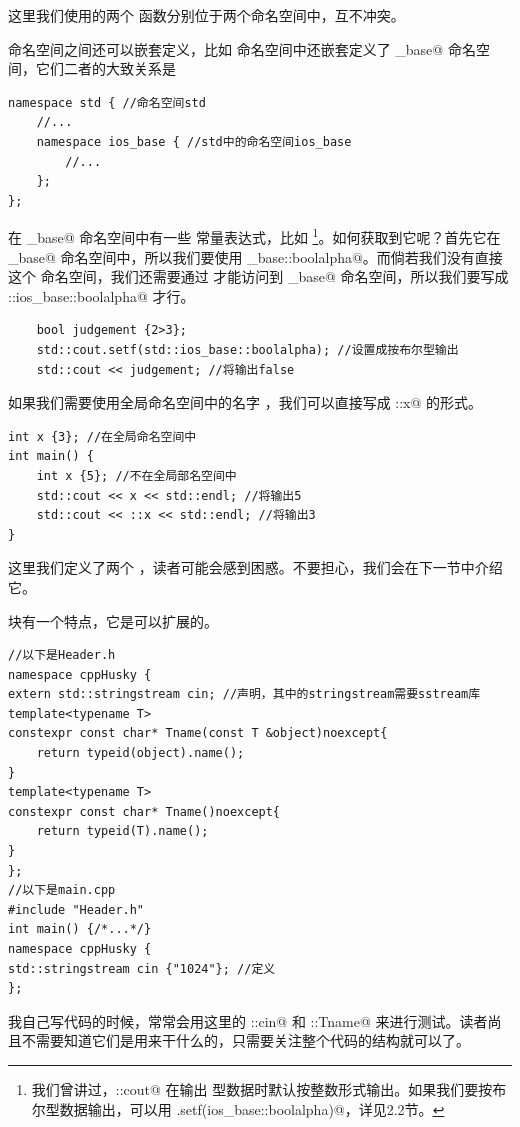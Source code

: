 这里我们使用的两个 \lstinline@max@ 函数分别位于两个命名空间中，互不冲突。\par
命名空间之间还可以嵌套定义，比如 \lstinline@std@ 命名空间中还嵌套定义了 \lstinline@ios_base@ 命名空间，它们二者的大致关系是
\begin{lstlisting}
namespace std { //命名空间std
    //...
    namespace ios_base { //std中的命名空间ios_base
        //...
    };
};
\end{lstlisting}\par
在 \lstinline@ios_base@ 命名空间中有一些 \lstinline@fmtflags@ 常量表达式，比如 \lstinline@boolalpha@\footnote{我们曾讲过，\lstinline@std::cout@ 在输出 \lstinline@bool@ 型数据时默认按整数形式输出。如果我们要按布尔型数据输出，可以用 \lstinline@cout.setf(ios_base::boolalpha)@，详见2.2节。}。如何获取到它呢？首先它在 \lstinline@ios_base@ 命名空间中，所以我们要使用 \lstinline@ios_base::boolalpha@。而倘若我们没有直接 \lstinline@using@ 这个 \lstinline@std@ 命名空间，我们还需要通过 \lstinline@std@ 才能访问到 \lstinline@ios_base@ 命名空间，所以我们要写成 \lstinline@std::ios_base::boolalpha@ 才行。\par
\begin{lstlisting}
    bool judgement {2>3};
    std::cout.setf(std::ios_base::boolalpha); //设置成按布尔型输出
    std::cout << judgement; //将输出false
\end{lstlisting}\par
如果我们需要使用全局命名空间中的名字 \lstinline@x@，我们可以直接写成 \lstinline@::x@ 的形式。
\begin{lstlisting}
int x {3}; //在全局命名空间中
int main() {
    int x {5}; //不在全局部名空间中
    std::cout << x << std::endl; //将输出5
    std::cout << ::x << std::endl; //将输出3
}
\end{lstlisting}
这里我们定义了两个 \lstinline@x@，读者可能会感到困惑。不要担心，我们会在下一节中介绍它。\par
\lstinline@namespace@ 块有一个特点，它是可以扩展的。
\begin{lstlisting}
//以下是Header.h
namespace cppHusky {
extern std::stringstream cin; //声明，其中的stringstream需要sstream库
template<typename T>
constexpr const char* Tname(const T &object)noexcept{
    return typeid(object).name();
}
template<typename T>
constexpr const char* Tname()noexcept{
    return typeid(T).name();
}
};
//以下是main.cpp
#include "Header.h"
int main() {/*...*/}
namespace cppHusky {
std::stringstream cin {"1024"}; //定义
};
\end{lstlisting}
我自己写代码的时候，常常会用这里的 \lstinline@cppHusky::cin@ 和 \lstinline@cppHusky::Tname@ 来进行测试。读者尚且不需要知道它们是用来干什么的，只需要关注整个代码的结构就可以了。\par
